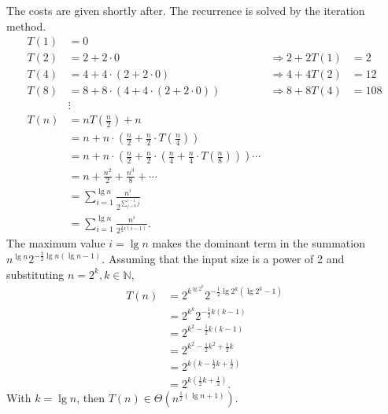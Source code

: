 \documentclass[12pt]{article}
\begin{document}
\begin{enumerate}
\begin{enumerate}
    The costs are given shortly after. The recurrence is solved by the iteration method. 
    \begin{align*}
      T(1) & = 0                                                                                                          \\
      T(2) & = 2 + 2 \cdot 0                             & \Rightarrow 2 + 2T(1) &= 2                                     \\
      T(4) & = 4 + 4 \cdot (2 + 2 \cdot 0)               & \Rightarrow 4 + 4T(2) &= 12                                    \\
      T(8) & = 8 + 8 \cdot (4 + 4 \cdot (2 + 2 \cdot 0)) & \Rightarrow 8 + 8T(4) &= 108                                   \\
           & \vdots                                                                                                       \\
      T(n) & = nT(\tfrac{n}{2}) + n                                                                                       \\
           & = n + n \cdot (\tfrac{n}{2} + \tfrac{n}{2} \cdot T(\tfrac{n}{4}))                                            \\
           & = n + n \cdot (\tfrac{n}{2} + \tfrac{n}{2} \cdot (\tfrac{n}{4} + \tfrac{n}{4} \cdot T(\tfrac{n}{8}))) \cdots \\
           & = n + \tfrac{n^{2}}{2} + \tfrac{n^{3}}{8} + \cdots                                                           \\
           & = \sum_{i = 1}^{\lg n} \frac{n^{i}}{2^{\sum_{j = 0}^{i - 1} j}}                                              \\
           & = \sum_{i = 1}^{\lg n} \frac{n^{i}}{2^{\frac{1}{2}i (i - 1)}}.
    \end{align*}
    The maximum value $i = \lg n$ makes the dominant term in the summation $n^{\lg n} 2^{-\frac{1}{2}\lg n(\lg n - 1)}$. Assuming that the input size is a power of 2 and substituting $n = 2^{k}, k \in \mathbb{N}$,
    \begin{align*}
      T(n) & = 2^{k^{\lg 2^{k}}}2^{-\frac{1}{2}\lg 2^{k}(\lg 2^{k} - 1)} \\
           & = 2^{k^{k}}2^{-\frac{1}{2}k(k - 1)}                         \\
           & = 2^{k^{2} - \frac{1}{2}k(k - 1)}                           \\
           & = 2^{k^{2} - \frac{1}{2}k^{2} + \frac{1}{2}k}               \\
           & = 2^{k(k - \frac{1}{2}k + \frac{1}{2})}                     \\
           & = 2^{k(\frac{1}{2}k + \frac{1}{2})}.
    \end{align*}
    With $k = \lg n$, then $T(n) \in \Theta(n^{\frac{1}{2}(\lg n + 1)})$.
  \end{enumerate}
\end{enumerate}
\end{document}
